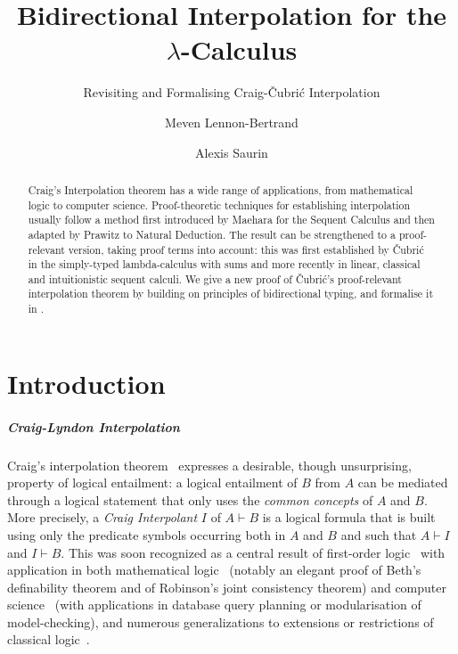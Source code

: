 \documentclass[a4paper,UKenglish,cleveref, autoref, thm-restate]{lipics-v2021}
\title{Bidirectional Interpolation for the \(\lambda\)-Calculus}
\subtitle{Revisiting and Formalising Craig-\v Cubri\' c Interpolation}
\author{Meven {Lennon-Bertrand}}{Université Paris Cité, INRIA, CNRS, IRIF, F-75013 Paris, France}{meven.bertrand@inria.fr}{https://orcid.org/0000-0002-7079-8826}{}
\author{Alexis Saurin}{Université Paris Cité, CNRS, INRIA, IRIF, F-75013 Paris, France}{Alexis.Saurin@irif.fr}{https://orcid.org/0009-0002-1304-5518}{}
\begin{document}
\maketitle

\begin{abstract}
Craig's Interpolation theorem has a wide range of applications, from mathematical logic to computer science. Proof-theoretic techniques for establishing interpolation usually follow a method first introduced by Maehara for the Sequent Calculus and then adapted by Prawitz to Natural Deduction. 
%
The result can be strengthened to a proof-relevant version, taking proof terms into account: this was first established by \v Cubri\'c in the simply-typed lambda-calculus with sums and more recently in linear, classical and intuitionistic sequent calculi.
%
We give a new proof of \v Cubri\' c's proof-relevant interpolation theorem by building on principles of bidirectional typing, and formalise
it in \Rocq.
\end{abstract}

\section{Introduction}
\label{sec:intro}

\subparagraph*{Craig-Lyndon Interpolation}

Craig's interpolation theorem~\cite{Craig57,Craig57a} expresses a desirable, though unsurprising, property of logical entailment: a logical entailment of $B$ from $A$ can be mediated through a logical statement that only uses the \emph{common concepts} of $A$ and $B$. More precisely, a \emph{Craig Interpolant} $I$ of $A \vdash B$ is a logical formula that is built using only the predicate symbols occurring both in $A$ and $B$ and such that $A \vdash I$ and $I \vdash B$.
%
This was soon recognized as a central result of first-order logic~\cite{Feferman08,vanBenthem08} with application in both mathematical logic~\cite{Robinson56,Beth1953padoa,Feferman08,Vaananen08} (notably an elegant proof of Beth's definability theorem and of Robinson's joint consistency theorem) and computer science~\cite{Lavalette08,Troelstra_Schwichtenberg_2000,McMillan18} (with applications in database query planning or modularisation of model-checking), and numerous generalizations to extensions or restrictions of classical logic~\cite{Vaananen08,Schutte,Prawitz1965-PRANDA}.
\end{document}
